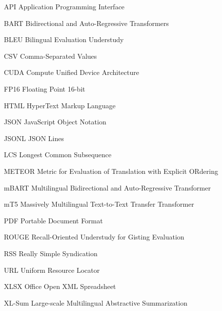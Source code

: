 \begin{thenomenclature}


  \item [{API}]\begingroup Application Programming Interface
		\nompageref{}
  \item [{BART}]\begingroup Bidirectional and Auto-Regressive Transformers
		\nompageref{}
  \item [{BLEU}]\begingroup Bilingual Evaluation Understudy
		\nompageref{}
  \item [{CSV}]\begingroup Comma-Separated Values
		\nompageref{}
  \item [{CUDA}]\begingroup Compute Unified Device Architecture
		\nompageref{}
  \item [{FP16}]\begingroup Floating Point 16-bit
		\nompageref{}
  \item [{HTML}]\begingroup HyperText Markup Language
		\nompageref{}
  \item [{JSON}]\begingroup JavaScript Object Notation
		\nompageref{}
  \item [{JSONL}]\begingroup JSON Lines
		\nompageref{}
  \item [{LCS}]\begingroup Longest Common Subsequence
		\nompageref{}
  \item [{METEOR}]\begingroup Metric for Evaluation of Translation with Explicit ORdering
		\nompageref{}
  \item [{mBART}]\begingroup Multilingual Bidirectional and Auto-Regressive Transformer
		\nompageref{}
  \item [{mT5}]\begingroup Massively Multilingual Text-to-Text Transfer Transformer
		\nompageref{}
  \item [{PDF}]\begingroup Portable Document Format
		\nompageref{}
  \item [{ROUGE}]\begingroup Recall-Oriented Understudy for Gisting Evaluation
		\nompageref{}
  \item [{RSS}]\begingroup Really Simple Syndication
		\nompageref{}
  \item [{URL}]\begingroup Uniform Resource Locator
		\nompageref{}
  \item [{XLSX}]\begingroup Office Open XML Spreadsheet
		\nompageref{}
  \item [{XL-Sum}]\begingroup Large-scale Multilingual Abstractive Summarization
		\nompageref{}

\end{thenomenclature}
